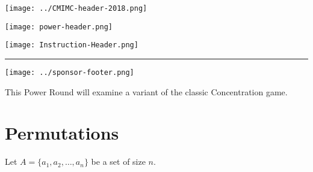 \documentclass[10pt]{article}
\begin{document}
\thispagestyle{empty}
\begin{center}


\texttt{[image: ../CMIMC-header-2018.png]}

\texttt{[image: power-header.png]}

\vspace{0.5in}

\texttt{[image: Instruction-Header.png]}
\noindent\rule{15.7cm}{2pt}
\end{center}

\vspace{10pt}



\vspace{0.7in}

\begin{center}
\texttt{[image: ../sponsor-footer.png]}
\end{center}
\newpage


This Power Round will examine a variant of the classic
Concentration game.

\renewcommand{\listtheoremname}{Problems}
\listoftheorems

\section{Permutations}
Let $A=\{a_1,a_2,\dots,a_n\}$ be a set of size $n$.
\end{document}
